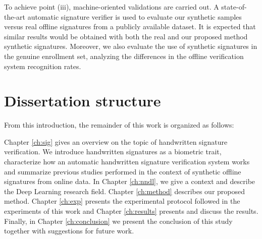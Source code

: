 To achieve point (iii), machine-oriented validations are carried out. A state-of-the-art automatic signature verifier is used to evaluate our synthetic samples versus real offline signatures from a publicly available dataset. It is expected that similar results would be obtained with both the real and our proposed method synthetic signatures. Moreover, we also evaluate the use of synthetic signatures in the genuine enrollment set, analyzing the differences in the offline verification system recognition rates. 

\section{Dissertation structure}
From this introduction, the remainder of this work is organized as follows:

Chapter \ref{ch:sig} gives an overview on the topic of handwritten signature verification. We introduce handwritten signatures as a biometric trait, characterize how an automatic handwritten signature verification system works and summarize previous studies performed in the context of synthetic offline signatures from online data. In Chapter \ref{ch:nndl}, we give a context and describe the  Deep Learning research field. Chapter \ref{ch:method} describes our proposed method. Chapter \ref{ch:exp} presents the experimental protocol followed in the experiments of this work and Chapter \ref{ch:results} presents and discuss the results. Finally, in Chapter \ref{ch:conclusion} we present the conclusion of this study together with suggestions for future work.